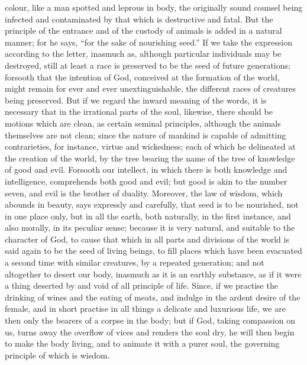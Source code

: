 colour, like a man spotted and leprous in body, the originally sound counsel being infected and
contaminated by that which is destructive and fatal. But the principle of the entrance and of the
custody of animals is added in a natural manner; for he says, ``for the sake of nourishing seed.'' If
we take the expression according to the letter, inasmuch as, although particular individuals may be
destroyed, still at least a race is preserved to be the seed of future generations; forsooth that the
intention of God, conceived at the formation of the world, might remain for ever and ever
unextinguishable, the different races of creatures being preserved. But if we regard the inward
meaning of the words, it is necessary that in the irrational parts of the soul, likewise, there should
be motions which are clean, as certain seminal principles, although the animals themselves are not
clean; since the nature of mankind is capable of admitting contrarieties, for instance, virtue and
wickedness; each of which he delineated at the creation of the world, by the tree bearing the name
of the tree of knowledge of good and evil. Forsooth our intellect, in which there is both knowledge
and intelligence, comprehends both good and evil; but good is akin to the number seven, and evil is
the brother of duality. Moreover, the law of wisdom, which abounds in beauty, says expressly and
carefully, that seed is to be nourished, not in one place only, but in all the earth, both naturally, in
the first instance, and also morally, in its peculiar sense; because it is very natural, and suitable to
the character of God, to cause that which in all parts and divisions of the world is said again to be
the seed of living beings, to fill places which have been evacuated a second time with similar
creatures, by a repeated generation; and not altogether to desert our body, inasmuch as it is an
earthly substance, as if it were a thing deserted by and void of all principle of life. Since, if we
practise the drinking of wines and the eating of meats, and indulge in the ardent desire of the
female, and in short practise in all things a delicate and luxurious life, we are then only the bearers
of a corpse in the body; but if God, taking compassion on us, turns away the overflow of vices and
renders the soul dry, he will then begin to make the body living, and to animate it with a purer soul,
the governing principle of which is wisdom.

